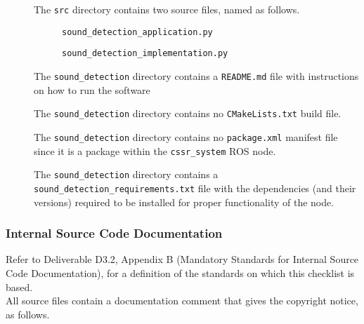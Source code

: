 \documentclass{CSSRforAfrica}
\newcommand{\checkboxChecked}{\fbox{\ding{51}}} %
\begin{document}
\begin{description}
\item[\checkboxChecked] The  {\small \verb+src+} directory contains two source files, named as follows.
\begin{description}
\item[\checkboxChecked] {\small \verb+sound_detection_application.py+}  
\item[\checkboxChecked]  {\small \verb+sound_detection_implementation.py+}  
\end{description} 

\item[\checkboxChecked] The {\small \verb+sound_detection+} directory contains  a {\small \verb+README.md+} file with  instructions on how to run the software 
\item[\checkboxChecked] The {\small \verb+sound_detection+} directory contains  no {\small \verb+CMakeLists.txt+} build file.
\item[\checkboxChecked] The {\small \verb+sound_detection+} directory contains  no {\small \verb+package.xml+} manifest file since it is a package within the {\small \verb+cssr_system+} ROS node.
\item[\checkboxChecked] The {\small \verb+sound_detection+} directory contains  a {\small \verb+sound_detection_requirements.txt+} file with the dependencies (and their versions) required to be installed for proper functionality of the node.

\end{description}


 
 \newpage
\subsubsection{Internal Source Code Documentation}
\label{subsubsection:sound_detection_documentation_standards}  
 
Refer to Deliverable D3.2, Appendix B (Mandatory Standards for Internal Source Code Documentation), for a definition of the standards on which this checklist is based.\\

\noindent All source files contain a documentation comment that gives the copyright notice, as follows.
 
\end{document}
